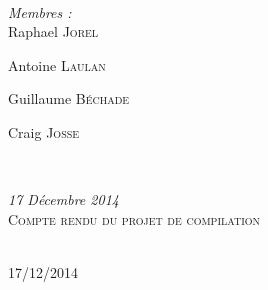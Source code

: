 \documentclass[a4paper,oneside]{article}
\begin{document}
\begin{titlepage}

  \newcommand{\HRule}{\rule{\linewidth}{0.5mm}} %

   \center %
   \\[0.4cm] %
%
 
  
  \vfill
  \begin{minipage}{0.4\textwidth}
    \begin{flushleft} \large
      \emph{Membres : }\\
      Raphael \textsc{Jorel} %
      
      Antoine \textsc{Laulan} %

      Guillaume \textsc{Béchade} %

      Craig \textsc{Josse} %
    \end{flushleft}
  \end{minipage}
  ~
  \begin{minipage}{0.4\textwidth}
    \begin{flushright} \large
      \emph{17 Décembre 2014} \\
      \textsc{Compte rendu du projet de compilation} %
    \end{flushright}
  \end{minipage}\\[4cm]


  \textsc{17/12/2014}\\[3cm] %

  \vfill %

\end{titlepage}
\end{document}
